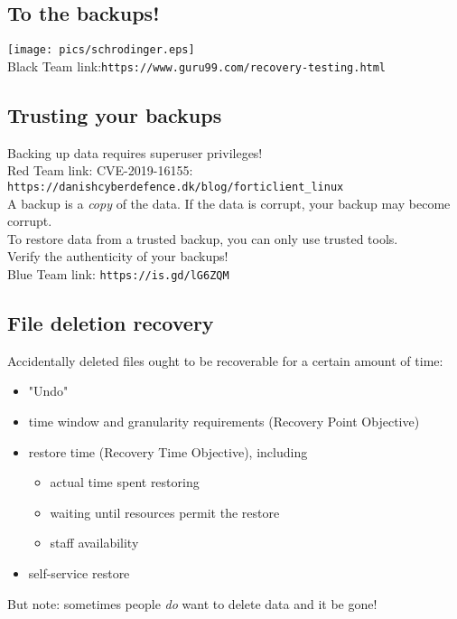 \documentclass[xga]{xdvislides}
\begin{document}
\subsection{To the backups!}
\vspace*{\fill}
\begin{center}
	\texttt{[image: pics/schrodinger.eps]} \\
	Black Team link:\verb+https://www.guru99.com/recovery-testing.html+
\end{center}
\vspace*{\fill}

\subsection{Trusting your backups}
Backing up data requires superuser privileges! \\
Red Team link: CVE-2019-16155: \verb+https://danishcyberdefence.dk/blog/forticlient_linux+ \\


A backup is a {\em copy} of the data.  If the data is
corrupt, your backup may become corrupt. \\

To restore data from a trusted backup, you can only
use trusted tools. \\

Verify the authenticity of your backups! \\

Blue Team link: \verb+https://is.gd/lG6ZQM+

\subsection{File deletion recovery}
Accidentally deleted files ought to be recoverable for
a certain amount of time:
\begin{itemize}
	\item "Undo"
	\item time window and granularity requirements (Recovery Point Objective)
	\item restore time (Recovery Time Objective), including
		\begin{itemize}
			\item actual time spent restoring
			\item waiting until resources permit the restore
			\item staff availability
		\end{itemize}
	\item self-service restore
\end{itemize}
\vspace{.5in}
But note: sometimes people {\em do} want to delete
data and it be gone!
\end{document}
